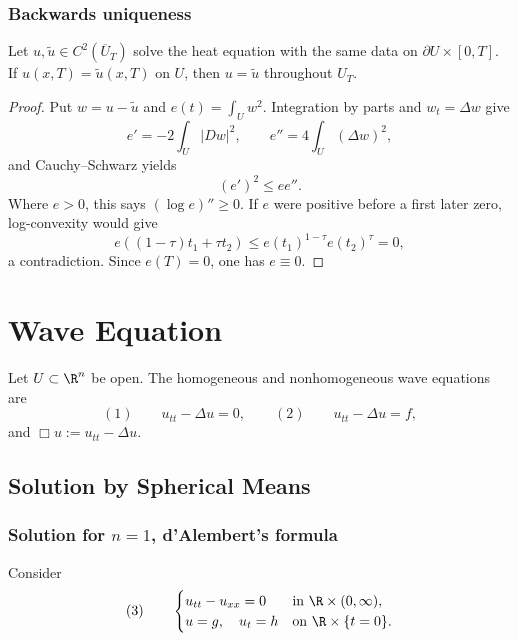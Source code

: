 \subsubsection{Backwards uniqueness}
\label{sec:heat-backwards-uniqueness}

\begin{theorem}
\label{thm:backwards-uniqueness-heat-equation}
Let $u,\widetilde u\in C^2(\overline U_T)$ solve the heat equation with the
same data on $\partial U\times[0,T]$. If $u(x,T)=\widetilde u(x,T)$ on $U$,
then $u=\widetilde u$ throughout $U_T$.
\end{theorem}
\begin{proof}
\sketch Put $w=u-\widetilde u$ and $e(t)=\int_Uw^2$. Integration by parts and
$w_t=\Delta w$ give
$$e'=-2\int_U|Dw|^2,
\qquad
e''=4\int_U(\Delta w)^2,$$
and Cauchy--Schwarz yields
$$(e')^2\le ee''.$$
Where $e>0$, this says $(\log e)''\ge0$. If $e$ were positive before a first
later zero, log-convexity would give
$$e((1-\tau)t_1+\tau t_2)
\le e(t_1)^{1-\tau}e(t_2)^\tau=0,$$
a contradiction. Since $e(T)=0$, one has $e\equiv0$.
\end{proof}

\section{Wave Equation}
\label{sec:wave-equation}

Let $U\subset\R^n$ be open. The homogeneous and nonhomogeneous wave equations
are
$$(1)\qquad u_{tt}-\Delta u=0,
\qquad
(2)\qquad u_{tt}-\Delta u=f,$$
and $\Box u:=u_{tt}-\Delta u$.

\subsection{Solution by Spherical Means}
\label{sec:wave-solution-spherical-means}

\subsubsection{Solution for $n = 1$, d'Alembert's formula}
\label{sec:wave-dalembert-formula}

Consider
$$(3)\qquad
\begin{cases}
u_{tt}-u_{xx}=0&\text{in }\R\times(0,\infty),\\
u=g,\quad u_t=h&\text{on }\R\times\{t=0\}.
\end{cases}$$


